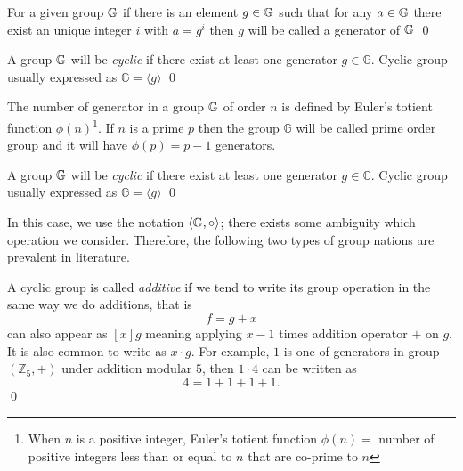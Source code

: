 \begin{definition}
	For a given group $\mathbb{G}\index{group}$ if there is an element $g\in\mathbb{G}\index{group}$ such that for any $a\in\mathbb{G}\index{group}$ there exist an unique integer $i$ with $a=g^{i}$ then $g$ will be called a   generator of  $\mathbb{G}\index{group}$
	\qed
\end{definition}

\begin{definition}
	A group $\mathbb{G}\index{group}$ will be {\em cyclic} if there exist at least one generator $g \in \mathbb{G}$. Cyclic group usually expressed as $\mathbb{G} = \langle g \rangle$
	\qed 
\end{definition}

\begin{remark}
	The number of generator in a group $\mathbb{G}\index{group}$ of order $n$ is defined by Euler's totient function $\phi(n)$\footnote{When $n$ is a positive integer, Euler's totient function $\phi(n)=$ number of positive integers less than or equal to $n$ that are co-prime to $n$}.
	If $n$ is a prime $p$ then the  group $\mathbb{G}$ will be called prime order group and it will have $\phi(p) = p-1$ generators.
\end{remark}

\begin{definition}
	A group $\mathbb{G}\index{group}$ will be {\em cyclic} if there exist at least one generator $g \in \mathbb{G}$. Cyclic group usually expressed as $\mathbb{G} = \langle g \rangle$ 
	\qed 
\end{definition}

In this case, we use the notation $\langle\mathbb{G}\index{group},\circ\rangle$; there exists some ambiguity which operation we consider.
Therefore, the following two types of group nations are prevalent in literature.

\begin{definition}
	A cyclic group is called \textit{additive} if we tend to write its group operation in the same way we do additions, that is 
	$$f = g + x$$ 
	can also appear as $[x]g$ meaning applying $x -1$ times addition operator $+$ on $g$.
	It is also common to write as $x \cdot g$.
	For example, $1$ is one of generators in group $(\mathbb{Z}_5, + )$ under addition modular $5$, then $1 \cdot 4$ can be written as $$ 4 = 1+ 1+ 1+1.$$
	\qed
\end{definition}

